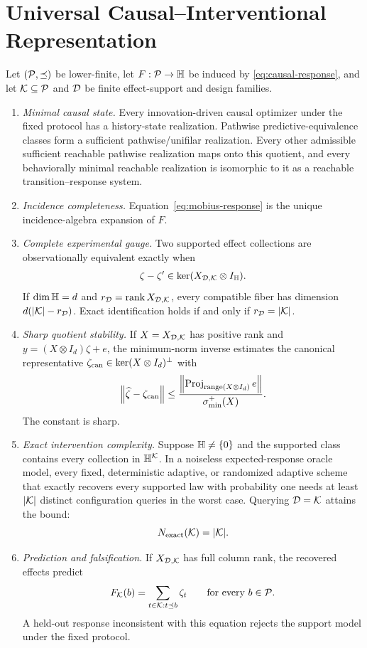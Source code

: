 \section{Universal Causal--Interventional Representation}
\label{sec:universal-representation}

\begin{theorem}
\label{thm:universal-interventional-calculus}
Let $(\mathcal P,\preceq)$ be lower-finite, let $F:\mathcal P\to\mathbb H$ be induced by \cref{eq:causal-response}, and let $\mathcal K\subseteq\mathcal P$ and $\mathcal D$ be finite effect-support and design families.
\begin{enumerate}[leftmargin=*,itemsep=3pt,label=(\roman*)]
\item \emph{Minimal causal state.}  Every innovation-driven causal optimizer under the fixed protocol has a history-state realization.  Pathwise predictive-equivalence classes form a sufficient pathwise/unifilar realization.  Every other admissible sufficient reachable pathwise realization maps onto this quotient, and every behaviorally minimal reachable realization is isomorphic to it as a reachable transition--response system.
\item \emph{Incidence completeness.}  Equation~\eqref{eq:mobius-response} is the unique incidence-algebra expansion of $F$.
\item \emph{Complete experimental gauge.}  Two supported effect collections are observationally equivalent exactly when
\[
\zeta-\zeta'\in\ker(X_{\mathcal D,\mathcal K}\otimes I_{\mathbb H}).
\]
If $\dim\mathbb H=d$ and $r_{\mathcal D}=\operatorname{rank} X_{\mathcal D,\mathcal K}$, every compatible fiber has dimension $d(|\mathcal K|-r_{\mathcal D})$.  Exact identification holds if and only if $r_{\mathcal D}=|\mathcal K|$.
\item \emph{Sharp quotient stability.}  If $X=X_{\mathcal D,\mathcal K}$ has positive rank and $y=(X\otimes I_d)\zeta+e$, the minimum-norm inverse estimates the canonical representative $\zeta_{\rm can}\in\ker(X\otimes I_d)^\perp$ with
\[
\left\lVert \widehat\zeta-\zeta_{\rm can}\right\rVert
\le
\frac{\left\lVert \operatorname{Proj}_{\operatorname{range}(X\otimes I_d)}e\right\rVert}{\sigma_{\min}^+(X)}.
\]
The constant is sharp.
\item \emph{Exact intervention complexity.}  Suppose $\mathbb H\ne\{0\}$ and the supported class contains every collection in $\mathbb H^{\mathcal K}$.  In a noiseless expected-response oracle model, every fixed, deterministic adaptive, or randomized adaptive scheme that exactly recovers every supported law with probability one needs at least $|\mathcal K|$ distinct configuration queries in the worst case.  Querying $\mathcal D=\mathcal K$ attains the bound:
\[
N_{\rm exact}(\mathcal K)=|\mathcal K|.
\]
\item \emph{Prediction and falsification.}  If $X_{\mathcal D,\mathcal K}$ has full column rank, the recovered effects predict
\[
F_{\mathcal K}(b)=\sum_{t\in\mathcal K:t\preceq b}\zeta_t
\qquad\text{for every }b\in\mathcal P.
\]
A held-out response inconsistent with this equation rejects the support model under the fixed protocol.
\end{enumerate}
\end{theorem}

